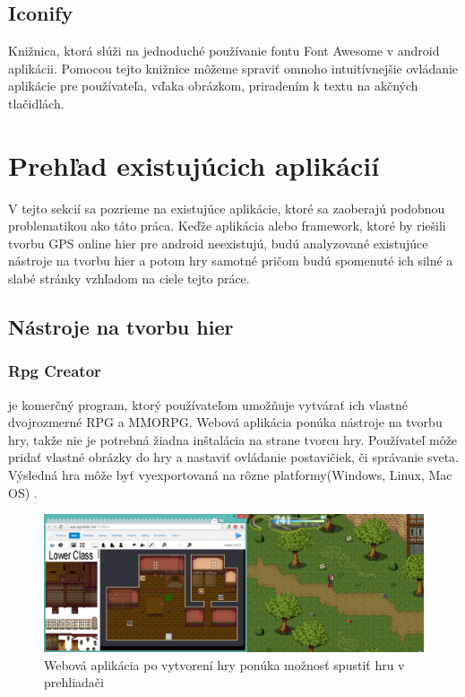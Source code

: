 \subsection{Iconify}
Knižnica, ktorá slúži na jednoduché používanie fontu Font Awesome v android aplikácii. Pomocou tejto knižnice môžeme spraviť omnoho intuitívnejšie ovládanie aplikácie pre používateľa, vďaka obrázkom, priradením k textu na akčných tlačidlách.


\section{Prehľad existujúcich aplikácií}
V tejto sekcií sa pozrieme na existujúce aplikácie, ktoré sa zaoberajú podobnou problematikou ako táto práca. Keďže aplikácia alebo framework, ktoré by riešili tvorbu GPS online hier pre android neexistujú, budú analyzované existujúce nástroje na tvorbu hier a potom hry samotné pričom budú spomenuté ich silné a slabé stránky vzhľadom na ciele tejto práce. 

\subsection{Nástroje na tvorbu hier}

\subsubsection{Rpg Creator} je komerčný program, ktorý používateľom umožňuje vytvárať ich vlastné dvojrozmerné RPG a MMORPG. Webová aplikácia ponúka nástroje na tvorbu hry, takže nie je potrebná žiadna inštalácia na strane tvorcu hry. Používateľ môže pridať vlastné obrázky do hry a nastaviť ovládanie postavičiek, či správanie sveta. Výsledná hra môže byť vyexportovaná na rôzne platformy(Windows, Linux, Mac OS) \cite{rpgcreator}.

\begin{figure}
  \centering
  \includegraphics[width=14cm]{mainmatter/imgs/rpgcreator.png}
  \caption{Webová aplikácia po vytvorení hry ponúka možnosť spustiť hru v prehliadači}
  \label{fig:rpgcreator}
\end{figure}


